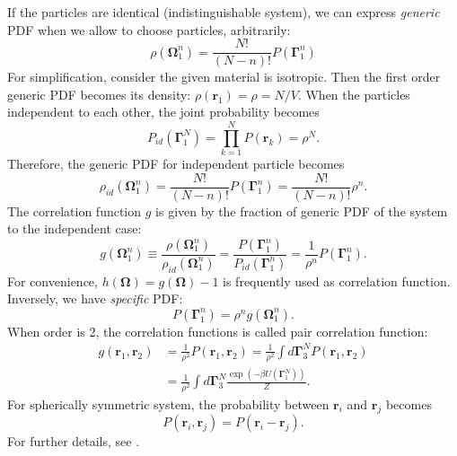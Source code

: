 \documentclass[10pt, a4paper]{article}
\begin{document}
\begin{appendices}
  If the particles are identical (indistinguishable system), we can express \textit{generic} PDF when we allow to choose particles, arbitrarily:
  \begin{equation}
    \rho(\boldsymbol{\Omega}_{1}^{n}) = \frac{N!}{(N-n)!}P(\boldsymbol{\Gamma}_{1}^{n})\label{eq:generic_PDF}
  \end{equation}
  For simplification, consider the given material is isotropic. Then the first order generic PDF becomes its density: $\rho(\mathbf{r}_1) = \rho = N/V$. When the particles independent to each other, the joint probability becomes 
  \begin{equation}
    P_{id}(\boldsymbol{\Gamma}_{1}^{N}) = \prod_{k=1}^{N}P(\mathbf{r}_k) = \rho^{N}.\label{eq:independent_PDF}
  \end{equation}
  Therefore, the generic PDF for independent particle becomes
  \begin{equation}
    \rho_{id}(\boldsymbol{\Omega}_{1}^{n}) = \frac{N!}{(N-n)!}P(\boldsymbol{\Gamma}_{1}^{n}) = \frac{N!}{(N-n)!}\rho^n.
  \end{equation}
  The correlation function $g$ is given by the fraction of generic PDF of the system to the independent case:
  \begin{equation}
    g(\boldsymbol{\Omega}_{1}^{n}) \equiv \frac{\rho(\boldsymbol{\Omega}_{1}^{n})}{\rho_{id}(\boldsymbol{\Omega}_{1}^{n})} = \frac{P(\boldsymbol{\Gamma}_{1}^{n})}{P_{id}(\boldsymbol{\Gamma}_{1}^{n})}=\frac{1}{\rho^n}P(\boldsymbol{\Gamma}_{1}^{n}).
  \end{equation}
  For convenience, $h(\boldsymbol{\Omega}) = g(\boldsymbol{\Omega}) - 1$ is frequently used as correlation function.
  Inversely, we have \textit{specific} PDF:
  \begin{equation}
    P(\boldsymbol{\Gamma}_{1}^{n}) = \rho^n g(\boldsymbol{\Omega}_{1}^{n}).
  \end{equation}
  When order is 2, the correlation functions is called pair correlation function:
  \begin{align}
    g(\mathbf{r}_1, \mathbf{r}_2) &= \frac{1}{\rho^2}P(\mathbf{r}_1, \mathbf{r}_2) = \frac{1}{\rho^2}\int d\boldsymbol{\Gamma}_{3}^{N}P(\mathbf{r}_1, \mathbf{r}_2) \\
    &= \frac{1}{\rho^2}\int d\boldsymbol{\Gamma}_{3}^{N} \frac{\exp(-\beta U(\boldsymbol{\Gamma}_{1}^{N}))}{Z}.
  \end{align}
  For spherically symmetric system, the probability between $\mathbf{r}_i$ and $\mathbf{r}_j$ becomes
  \begin{equation}
    P(\mathbf{r}_i, \mathbf{r}_j) = P(\mathbf{r}_i - \mathbf{r}_j).
  \end{equation}
  For further details, see \textcite{chandler1987}.



\end{appendices}
\end{document}
